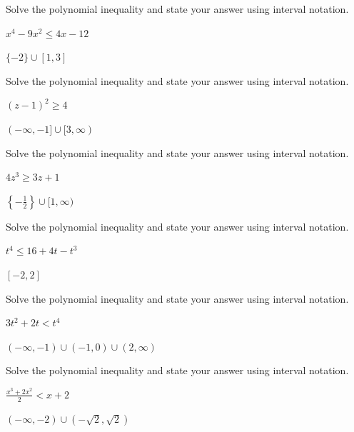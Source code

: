\documentclass{ximera}
\begin{document}
\begin{problem}
Solve the polynomial inequality and state your answer using interval notation.

$x^{4} - 9x^{2} \leq 4x - 12$

\begin{solution}
    $\{-2\} \cup [1, 3]$
\end{solution}

\end{problem}

\begin{problem}
Solve the polynomial inequality and state your answer using interval notation.

$(z - 1)^{2} \geq 4$
\begin{solution}
    $(-\infty, -1] \cup [3, \infty)$
\end{solution}

\end{problem}

\begin{problem}
Solve the polynomial inequality and state your answer using interval notation.

$4z^3 \geq 3z+1$

\begin{solution}
$\left\{ -\frac{1}{2} \right\} \cup [1, \infty)$
\end{solution} 
\end{problem}

\begin{problem}
Solve the polynomial inequality and state your answer using interval notation.

$t^4 \leq 16+4t-t^3$
\begin{solution}
    $[-2,2]$
\end{solution}

\end{problem}

\begin{problem}
Solve the polynomial inequality and state your answer using interval notation.

$3t^2 + 2t < t^4$

\begin{solution}
    $\left(-\infty, -1 \right) \cup \left(-1, 0 \right) \cup (2, \infty)$
\end{solution}


\end{problem}

\begin{problem}
Solve the polynomial inequality and state your answer using interval notation.

$\frac{x^3+2 x^2}{2} < x+2$

\begin{solution}
$(-\infty, -2) \cup \left(-\sqrt{2}, \sqrt{2} \right)$
\end{solution}
\end{problem}
\end{document}
